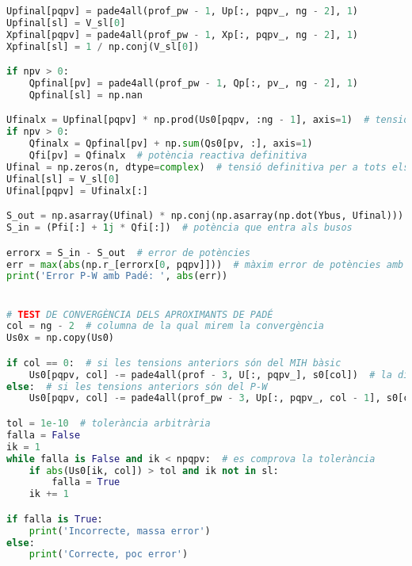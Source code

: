 \begin{lstlisting}[language=Python,numbers=none]
Upfinal[pqpv] = pade4all(prof_pw - 1, Up[:, pqpv_, ng - 2], 1)
Upfinal[sl] = V_sl[0]
Xpfinal[pqpv] = pade4all(prof_pw - 1, Xp[:, pqpv_, ng - 2], 1)
Xpfinal[sl] = 1 / np.conj(V_sl[0])

if npv > 0:
    Qpfinal[pv] = pade4all(prof_pw - 1, Qp[:, pv_, ng - 2], 1)
    Qpfinal[sl] = np.nan

Ufinalx = Upfinal[pqpv] * np.prod(Us0[pqpv, :ng - 1], axis=1)  # tensió final
if npv > 0:
    Qfinalx = Qpfinal[pv] + np.sum(Qs0[pv, :], axis=1)
    Qfi[pv] = Qfinalx  # potència reactiva definitiva
Ufinal = np.zeros(n, dtype=complex)  # tensió definitiva per a tots els busos
Ufinal[sl] = V_sl[0]
Ufinal[pqpv] = Ufinalx[:]

S_out = np.asarray(Ufinal) * np.conj(np.asarray(np.dot(Ybus, Ufinal)))  # potència que surt dels busos
S_in = (Pfi[:] + 1j * Qfi[:])  # potència que entra als busos

errorx = S_in - S_out  # error de potències
err = max(abs(np.r_[errorx[0, pqpv]]))  # màxim error de potències amb P-W
print('Error P-W amb Padé: ', abs(err))


# TEST DE CONVERGÈNCIA DELS APROXIMANTS DE PADÉ
col = ng - 2  # columna de la qual mirem la convergència
Us0x = np.copy(Us0)

if col == 0:  # si les tensions anteriors són del MIH bàsic
    Us0[pqpv, col] -= pade4all(prof - 3, U[:, pqpv_], s0[col])  # la diferència entre ara i amb 2 coeficients menys
else:  # si les tensions anteriors són del P-W
    Us0[pqpv, col] -= pade4all(prof_pw - 3, Up[:, pqpv_, col - 1], s0[col])

tol = 1e-10  # tolerància arbitrària
falla = False
ik = 1
while falla is False and ik < npqpv:  # es comprova la tolerància
    if abs(Us0[ik, col]) > tol and ik not in sl:
        falla = True
    ik += 1

if falla is True:
    print('Incorrecte, massa error')
else:
    print('Correcte, poc error')

    
\end{lstlisting}

